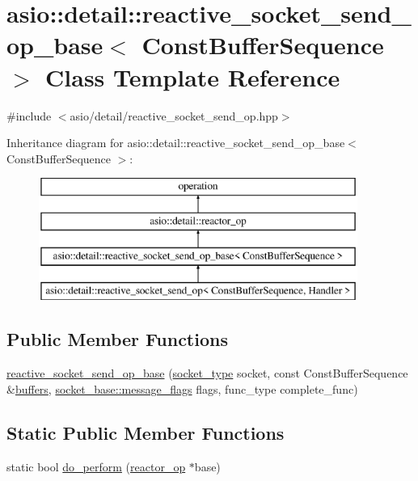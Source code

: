 \hypertarget{classasio_1_1detail_1_1reactive__socket__send__op__base}{}\section{asio\+:\+:detail\+:\+:reactive\+\_\+socket\+\_\+send\+\_\+op\+\_\+base$<$ Const\+Buffer\+Sequence $>$ Class Template Reference}
\label{classasio_1_1detail_1_1reactive__socket__send__op__base}


{\ttfamily \#include $<$asio/detail/reactive\+\_\+socket\+\_\+send\+\_\+op.\+hpp$>$}

Inheritance diagram for asio\+:\+:detail\+:\+:reactive\+\_\+socket\+\_\+send\+\_\+op\+\_\+base$<$ Const\+Buffer\+Sequence $>$\+:\begin{figure}[H]
\begin{center}
\leavevmode
\includegraphics[height=4.000000cm]{classasio_1_1detail_1_1reactive__socket__send__op__base}
\end{center}
\end{figure}
\subsection*{Public Member Functions}
\begin{DoxyCompactItemize}
\item 
\hyperlink{classasio_1_1detail_1_1reactive__socket__send__op__base_ad69d5eb8164cdd85af3a6e4edf81ef82}{reactive\+\_\+socket\+\_\+send\+\_\+op\+\_\+base} (\hyperlink{namespaceasio_1_1detail_a6798c771dd84b79798b1a08150706ea9}{socket\+\_\+type} socket, const Const\+Buffer\+Sequence \&\hyperlink{group__async__read_ga54dede45c3175148a77fe6635222c47d}{buffers}, \hyperlink{classasio_1_1socket__base_ac3cf77465dfedfe1979b5415cf32cc94}{socket\+\_\+base\+::message\+\_\+flags} flags, func\+\_\+type complete\+\_\+func)
\end{DoxyCompactItemize}
\subsection*{Static Public Member Functions}
\begin{DoxyCompactItemize}
\item 
static bool \hyperlink{classasio_1_1detail_1_1reactive__socket__send__op__base_a9fffc5c7a2de602eb552e925890ce8b3}{do\+\_\+perform} (\hyperlink{classasio_1_1detail_1_1reactor__op}{reactor\+\_\+op} $\ast$base)
\end{DoxyCompactItemize}
